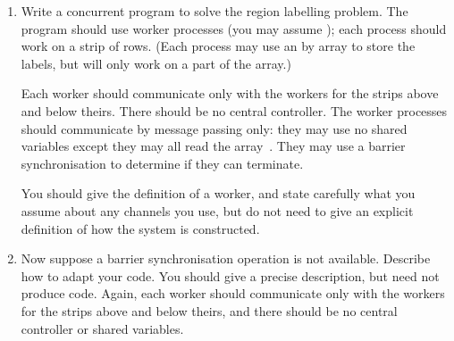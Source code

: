 \begin{question}

\begin{enumerate}
\item
Write a concurrent program to solve the region labelling problem.  The program
should use  worker processes (you may assume ); each
process should work on a strip of  rows.  (Each process
may use an  by  array to store the labels, but will only
work on a part of the array.)

Each worker should communicate only with the workers for the strips above and
below theirs.  There should be no central controller.
%
The worker processes should communicate by message passing only: they may use
no shared variables except they may all read the array~.  They may
use a barrier synchronisation to determine if they can terminate.

You should give the definition of a worker, and state carefully what you
assume about any channels you use, but do not need to give an explicit
definition of how the system is constructed. 



\item
Now suppose a barrier synchronisation operation is not available.  Describe
how to adapt your code.  You should give a precise description, but need not
produce code.  Again, each worker should communicate only with the workers for
the strips above and below theirs, and there should be no central controller
or shared variables.
\end{enumerate}
\end{question}


